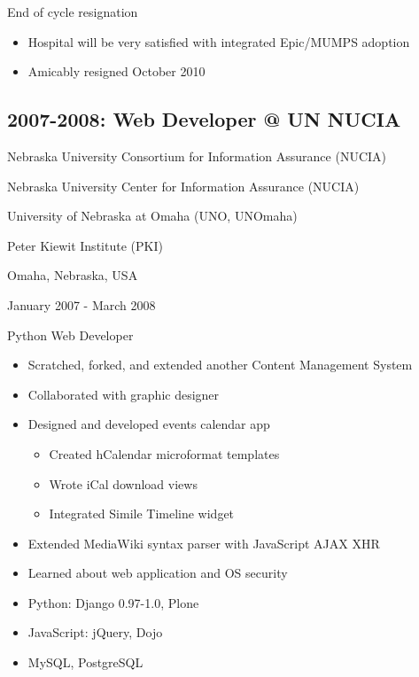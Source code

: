\documentclass[letter,,openany,oneside]{sphinxhowto}
\begin{document}
End of cycle resignation
\begin{itemize}
\item {} 
Hospital will be very satisfied with integrated Epic/MUMPS adoption

\item {} 
Amicably resigned October 2010

\end{itemize}


\subsection{2007-2008: Web Developer @ UN NUCIA}
\label{resume:web-developer-un-nucia}
\begin{DUlineblock}{0em}
\item[] Nebraska University Consortium for Information Assurance (NUCIA)
\item[] Nebraska University Center for Information Assurance (NUCIA)
\item[] University of Nebraska at Omaha (UNO, UNOmaha)
\item[] Peter Kiewit Institute (PKI)
\item[] Omaha, Nebraska, USA
\item[] January 2007 - March 2008
\end{DUlineblock}

Python Web Developer
\begin{itemize}
\item {} 
Scratched, forked, and extended another Content Management System

\item {} 
Collaborated with graphic designer

\item {} 
Designed and developed events calendar app
\begin{itemize}
\item {} 
Created hCalendar microformat templates

\item {} 
Wrote iCal download views

\item {} 
Integrated Simile Timeline widget

\end{itemize}

\item {} 
Extended MediaWiki syntax parser with JavaScript AJAX XHR

\item {} 
Learned about web application and OS security

\item {} 
Python: Django 0.97-1.0, Plone

\item {} 
JavaScript: jQuery, Dojo

\item {} 
MySQL, PostgreSQL

\end{itemize}
\end{document}
